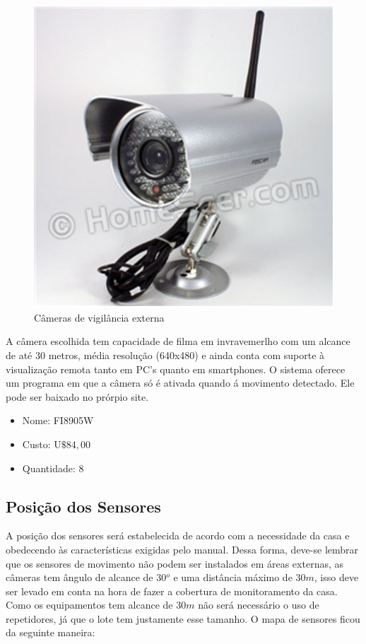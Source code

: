 \begin{enumerate}
	\begin{figure}[H]
	  \begin{center}
		\includegraphics[keepaspectratio,scale=0.5]{figuras/camera.eps}
		\caption{Câmeras de vigilância externa}
	  \end{center}
	\end{figure}
	
	A câmera escolhida tem capacidade de filma em invravemerlho com um alcance de até 30 metros, média resolução (640x480) e ainda conta com suporte à visualização remota tanto em PC’s quanto em smartphones. O sistema oferece um programa em que a câmera só é ativada quando á movimento detectado. Ele pode ser baixado no prórpio site.

	\begin{itemize}
		\item Nome: FI8905W
		\item Custo: U$\$ 84,00$
		\item Quantidade: 8
	\end{itemize}	

\end{enumerate}

\subsection{Posição dos Sensores}
	A posição dos sensores será estabelecida de acordo com a necessidade da casa e obedecendo às características exigidas pelo manual. Dessa forma, deve-se lembrar que os sensores de movimento não podem ser instalados em áreas externas, as câmeras tem ângulo de alcance de $30{^o}$ e uma distância máximo de $30m$, isso deve ser levado em conta na hora de fazer a cobertura de monitoramento da casa. Como os equipamentos tem alcance de $30m$ não será necessário o uso de repetidores, já que o lote tem justamente esse tamanho. O mapa de sensores ficou da seguinte maneira:

